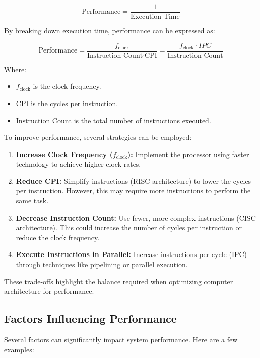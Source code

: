 \[
\text{Performance} = \frac{1}{\text{Execution Time}}
\]

By breaking down execution time, performance can be expressed as:

\[
\text{Performance} = \frac{f_{\text{clock}}}{\text{Instruction Count} \cdot \text{CPI}} = \frac{f_{\text{clock}}\cdot IPC}{\text{Instruction Count}}
\]

Where:
\begin{itemize}
    \item[] $f_{\text{clock}}$ is the clock frequency.
    \item[] $\text{CPI}$ is the cycles per instruction.
    \item[] $\text{Instruction Count}$ is the total number of instructions executed.
\end{itemize}

To improve performance, several strategies can be employed:

\begin{enumerate}
    \item \textbf{Increase Clock Frequency ($f_{\text{clock}}$):} Implement the processor using faster technology to achieve higher clock rates.
    \item \textbf{Reduce CPI:} Simplify instructions (RISC architecture) to lower the cycles per instruction. However, this may require more instructions to perform the same task.
    \item \textbf{Decrease Instruction Count:} Use fewer, more complex instructions (CISC architecture). This could increase the number of cycles per instruction or reduce the clock frequency.
    \item \textbf{Execute Instructions in Parallel:} Increase instructions per cycle (IPC) through techniques like pipelining or parallel execution.
\end{enumerate}
These trade-offs highlight the balance required when optimizing computer architecture for performance.

\subsection{Factors Influencing Performance}
Several factors can significantly impact system performance. Here are a few examples:


